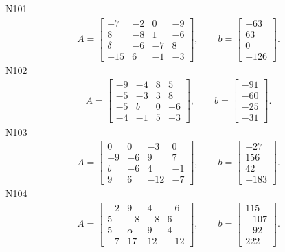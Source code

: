 \documentclass[11pt]{report}
\begin{document}
N101
\begin{align*}
 A = \left[\begin{matrix}-7 & -2 & 0 & -9\\8 & -8 & 1 & -6\\\delta & -6 & -7 & 8\\-15 & 6 & -1 & -3\end{matrix}\right],
\qquad b = \left[\begin{matrix}-63\\63\\0\\-126\end{matrix}\right]. 
 \end{align*}
N102
\begin{align*}
 A = \left[\begin{matrix}-9 & -4 & 8 & 5\\-5 & -3 & 3 & 8\\-5 & b & 0 & -6\\-4 & -1 & 5 & -3\end{matrix}\right],
\qquad b = \left[\begin{matrix}-91\\-60\\-25\\-31\end{matrix}\right]. 
 \end{align*}
N103
\begin{align*}
 A = \left[\begin{matrix}0 & 0 & -3 & 0\\-9 & -6 & 9 & 7\\b & -6 & 4 & -1\\9 & 6 & -12 & -7\end{matrix}\right],
\qquad b = \left[\begin{matrix}-27\\156\\42\\-183\end{matrix}\right]. 
 \end{align*}
N104
\begin{align*}
 A = \left[\begin{matrix}-2 & 9 & 4 & -6\\5 & -8 & -8 & 6\\5 & \alpha & 9 & 4\\-7 & 17 & 12 & -12\end{matrix}\right],
\qquad b = \left[\begin{matrix}115\\-107\\-92\\222\end{matrix}\right]. 
 \end{align*}
\end{document}
